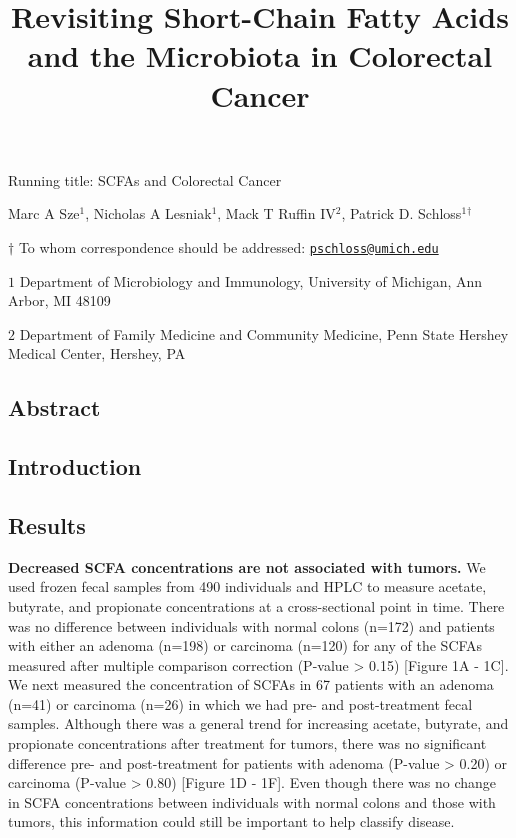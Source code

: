 \documentclass[11pt,]{article}
\title{Revisiting Short-Chain Fatty Acids and the Microbiota in Colorectal
Cancer}
\author{}
\date{}
\begin{document}
\maketitle

\vspace{35mm}

Running title: SCFAs and Colorectal Cancer

\vspace{35mm}

Marc A Sze\({^1}\), Nicholas A Lesniak\({^1}\), Mack T Ruffin
IV\({^2}\), Patrick D. Schloss\({^1}\)\({^\dagger}\)

\vspace{40mm}

\(\dagger\) To whom correspondence should be addressed:
\href{mailto:pschloss@umich.edu}{\nolinkurl{pschloss@umich.edu}}

\(1\) Department of Microbiology and Immunology, University of Michigan,
Ann Arbor, MI 48109

\(2\) Department of Family Medicine and Community Medicine, Penn State
Hershey Medical Center, Hershey, PA

\newpage

\linenumbers

\subsection{Abstract}\label{abstract}

\newpage

\subsection{Introduction}\label{introduction}

\newpage

\subsection{Results}\label{results}

\textbf{Decreased SCFA concentrations are not associated with tumors.}
We used frozen fecal samples from 490 individuals and HPLC to measure
acetate, butyrate, and propionate concentrations at a cross-sectional
point in time. There was no difference between individuals with normal
colons (n=172) and patients with either an adenoma (n=198) or carcinoma
(n=120) for any of the SCFAs measured after multiple comparison
correction (P-value \textgreater{} 0.15) {[}Figure 1A - 1C{]}. We next
measured the concentration of SCFAs in 67 patients with an adenoma
(n=41) or carcinoma (n=26) in which we had pre- and post-treatment fecal
samples. Although there was a general trend for increasing acetate,
butyrate, and propionate concentrations after treatment for tumors,
there was no significant difference pre- and post-treatment for patients
with adenoma (P-value \textgreater{} 0.20) or carcinoma (P-value
\textgreater{} 0.80) {[}Figure 1D - 1F{]}. Even though there was no
change in SCFA concentrations between individuals with normal colons and
those with tumors, this information could still be important to help
classify disease.
\end{document}
